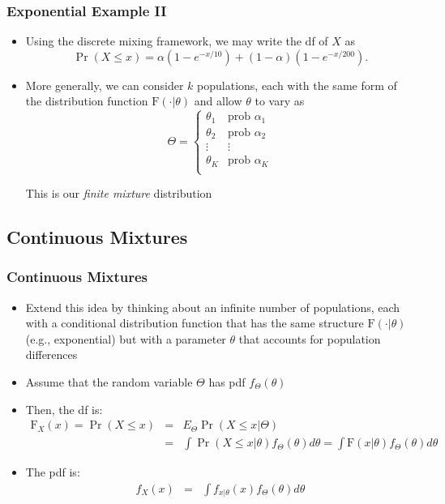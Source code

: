 \documentclass{beamer}
\begin{document}
\begin{frame}[shrink=2]
\frametitle{Exponential Example II}
\begin{itemize}
\item Using the discrete mixing framework, we may write the df of $X$ as
\begin{equation*}
\Pr(X \le x) = \alpha(1 - e^{-x/10}) + (1-\alpha)(1-e^{-x/200}) .
\end{equation*} \vspace{2mm}

\item More generally, we can consider $k$ populations, each with the same
form of the distribution function $\mathrm{F}(\cdot|\theta)$ and
allow $\theta$ to vary as
\[
\Theta=\left\{
\begin{array}{ll}
\theta_1  & \text{prob~} \alpha_1  \\
\theta_2  & \text{prob~} \alpha_2  \\
\vdots & \vdots \\
\theta_K & \text{prob~} \alpha_K \\
\end{array}
\right.
\] \vspace{2mm}

This is our \textit{finite mixture} distribution
\end{itemize}
\end{frame}

\subsection{Continuous Mixtures}

\begin{frame}[shrink=2]
\frametitle{Continuous Mixtures}
\begin{itemize}
\item Extend this idea by thinking about an infinite number of
populations, each with a conditional distribution function that has
the same structure $\mathrm{F}(\cdot|\theta)$ (e.g., exponential)
but with a parameter $\theta$ that accounts for population
differences \vspace{2mm}

\item Assume that the random variable $\Theta$ has pdf $f_\Theta
(\theta)$ \vspace{2mm}

\item Then, the df is:
\begin{eqnarray*}
\mathrm{F}_X(x) = \Pr(X \le x) &=& E_{\Theta} \Pr(X \le x|\Theta)\\
&=& \int \Pr(X \le x|\theta)f_{\Theta}(\theta) d\theta =\int
\mathrm{F}(x|\theta)f_{\Theta}(\theta) d\theta
\end{eqnarray*} \vspace{2mm}

\item The pdf is:
\begin{eqnarray*}
f_X (x) &=& \int f_{x | \theta}(x) f_{\Theta}(\theta) d\theta
\end{eqnarray*}
\end{itemize}
\end{frame}
\end{document}
